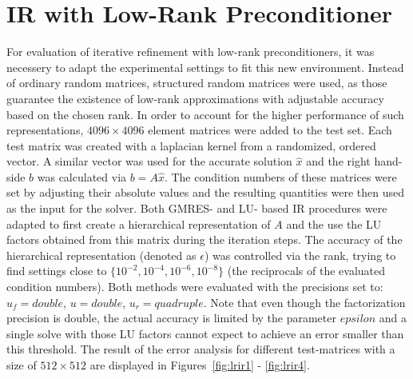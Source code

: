 \section{IR with Low-Rank Preconditioner}
\label{sec:low_rank}

For evaluation of iterative refinement with low-rank preconditioners, it was necessery to adapt the experimental settings to fit this new environment. Instead of ordinary random matrices, structured random matrices were used, as those guarantee the existence of low-rank approximations with adjustable accuracy based on the chosen rank. In order to account for the higher performance of such representations, $4096 \times 4096$ element matrices were added to the test set. Each test matrix was created with a laplacian kernel from a randomized, ordered vector. A similar vector was used for the accurate solution $\hat{x}$ and the right hand-side $b$ was calculated via $b = A\hat{x}$. The condition numbers of these matrices were set by adjusting their absolute values and the resulting quantities were then used as the input for the solver. Both GMRES- and LU- based IR procedures were adapted to first create a hierarchical representation of $A$ and the use the LU factors obtained from this matrix during the iteration steps. The accuracy of the hierarchical representation (denoted as $\epsilon$) was controlled via the rank, trying to find settings close to $\{10^{-2}, 10^{-4}, 10^{-6}, 10^{-8}\}$ (the reciprocals of the evaluated condition numbers).
Both methods were evaluated with the precisions set to: $u_f= double$, $u= double$, $u_r= quadruple$.
Note that even though the factorization precision is double, the actual accuracy is limited by the parameter $epsilon$ and a single solve with those LU factors cannot expect to achieve an error smaller than this threshold. The result of the error analysis for different test-matrices with a size of $512 \times 512$ are displayed in Figures~\hyperref[fig:lrir1]{\ref{fig:lrir1}} - \hyperref[fig:lrir4]{\ref{fig:lrir4}}.

